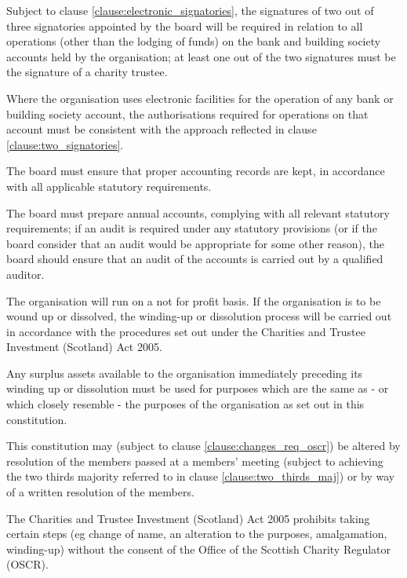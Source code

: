 ﻿\documentclass[a4paper,11pt,onecolumn ]{article}
\begin{document}
\begin{legal}
\item \label{clause:two_signatories} Subject to clause \ref{clause:electronic_signatories}, the signatures of two out of three signatories appointed by the board will be required in relation to all operations (other than the lodging of funds) on the bank and building society accounts held by the organisation; at least one out of the two signatures must be the signature of a charity trustee.

\item \label{clause:electronic_signatories} Where the organisation uses electronic facilities for the operation of any bank or building society account, the authorisations required for operations on that account must be consistent with the approach reflected in clause \ref{clause:two_signatories}.
\end{legal}

\begin{legal}
\item The board must ensure that proper accounting records are kept, in accordance with all applicable statutory requirements.
\item The board must prepare annual accounts, complying with all relevant statutory requirements; if an audit is required under any statutory provisions (or if the board consider that an audit would be appropriate for some other reason), the board should ensure that an audit of the accounts is carried out by a qualified auditor.
\end{legal}

\begin{legal}
\item The organisation will run on a not for profit basis. If the organisation is to be wound up or dissolved, the winding-up or dissolution process will be carried out in accordance with the procedures set out under the Charities and Trustee Investment (Scotland) Act 2005. 
\item Any surplus assets available to the organisation immediately preceding its winding up or dissolution must be used for purposes which are the same as - or which closely resemble - the purposes of the organisation as set out in this constitution.
\end{legal}

\begin{legal}
\item This constitution may (subject to clause \ref{clause:changes_req_oscr}) be altered by resolution of the members passed at a members’ meeting (subject to achieving the two thirds majority referred to in clause \ref{clause:two_thirds_maj}) or by way of a written resolution of the members.  
\item \label{clause:changes_req_oscr} The Charities and Trustee Investment (Scotland) Act 2005 prohibits taking certain steps (eg change of name, an alteration to the purposes, amalgamation, winding-up) without the consent of the Office of the Scottish Charity Regulator (OSCR).
\end{legal}
\end{document}
